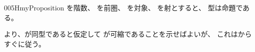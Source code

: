 \documentclass[index]{subfiles}
\begin{document}
\begin{myBlock}{005H}{myProposition}
  を階数、
  を前圏、
  を対象、
  を射とすると、
  型は命題である。
\end{myBlock}
\begin{myProof}
  より、が同型であると仮定して
  が可縮であることを示せばよいが、
  これはからすぐに従う。
\end{myProof}
\end{document}
